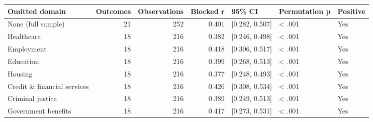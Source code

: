 \begin{tabular}{lrrrlll}
\toprule
Omitted domain & Outcomes & Observations & Blocked r & 95\% CI & Permutation p & Positive \\
\midrule
None (full sample) & 21 & 252 & 0.401 & [0.282, 0.507] & < .001 & Yes \\
Healthcare & 18 & 216 & 0.382 & [0.246, 0.498] & < .001 & Yes \\
Employment & 18 & 216 & 0.418 & [0.306, 0.517] & < .001 & Yes \\
Education & 18 & 216 & 0.399 & [0.268, 0.513] & < .001 & Yes \\
Housing & 18 & 216 & 0.377 & [0.248, 0.493] & < .001 & Yes \\
Credit \& financial services & 18 & 216 & 0.426 & [0.308, 0.534] & < .001 & Yes \\
Criminal justice & 18 & 216 & 0.389 & [0.249, 0.513] & < .001 & Yes \\
Government benefits & 18 & 216 & 0.417 & [0.273, 0.531] & < .001 & Yes \\
\bottomrule
\end{tabular}

